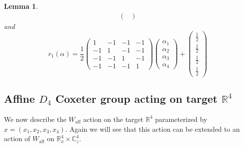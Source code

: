 \documentclass[12pt,letterpaper,reqno]{amsart}
\def\bm#1{#1}%
\def\mathbf#1{#1}%
\newtheorem{lem}[thm]{Lemma}
\theoremstyle{remark}
\theoremstyle{definition}
\numberwithin{thm}{section}
\numberwithin{equation}{section}
\numberwithin{figure}{section}
\newcommand{\R}{\ensuremath{\mathbb R}}
\newcommand{\C}{\ensuremath{\mathbb C}}
\newcommand{\bfalpha}{\ensuremath{\bm \alpha}}
\newcommand{\aff}{\mathrm{aff}}
\begin{document}
\begin{lem}
\[\begin{gathered}
\begin{pmatrix}
\end{pmatrix}
\end{gathered}
\]
and
\[
r_1(\bfalpha) = \frac{1}{2} \begin{pmatrix}
 1 & -1 &-1 & -1\\
 	-1 & 1 & -1 & -1\\
 	-1 & -1 &1 & -1\\
 	-1 & -1 &-1 & 1
 \end{pmatrix}
\begin{pmatrix}
\alpha_1 \\ \alpha_2 \\ \alpha_3 \\ \alpha_4	
\end{pmatrix}
+
\begin{pmatrix}
\frac12 \\ \frac12 \\ \frac12 \\ \frac12	
\end{pmatrix}
\]
\end{lem}


\subsection{Affine \texorpdfstring{$D_4$}{D4} Coxeter group acting on target \texorpdfstring{$\R^4$}{R4}}\label{subsec:target_action}

We now describe the $W_{\mathrm{aff}}$ action on the target $\R^4$ parameterized by $\mathbf{x}=(x_1,x_2,x_3,x_4)$. Again we will see that this action can be extended to an action of $W_\aff$ on $\R^4_\mathbf{x} \times \C^4_\mathbf{z}$.
\end{document}
